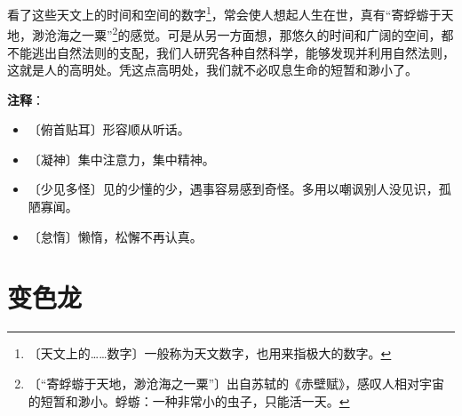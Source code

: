 \documentclass[12pt,UTF-8,openany]{ctexbook}
\begin{document}
\begin{normalsize}
    看了这些天文上的时间和空间的数字\footnote{〔天文上的……数字〕一般称为天文数字，也用来指极大的数字。}，常会使人想起人生在世，真有“寄蜉蝣于天地，渺沧海之一粟”\footnote{〔“寄蜉蝣于天地，渺沧海之一粟”〕出自苏轼的《赤壁赋》，感叹人相对宇宙的短暂和渺小。蜉蝣：一种非常小的虫子，只能活一天。}的感觉。可是从另一方面想，那悠久的时间和广阔的空间，都不能逃出自然法则的支配，我们人研究各种自然科学，能够发现并利用自然法则，这就是人的高明处。凭这点高明处，我们就不必叹息生命的短暂和渺小了。
    
\end{normalsize}


\newpage

\textbf{注释}：

\vspace{-1em}

\begin{itemize}
    \setlength\itemsep{-0.2em}
    \item 〔俯首贴耳〕形容顺从听话。
    \item 〔凝神〕集中注意力，集中精神。
    \item 〔少见多怪〕见的少懂的少，遇事容易感到奇怪。多用以嘲讽别人没见识，孤陋寡闻。
    \item 〔怠惰〕懒惰，松懈不再认真。
\end{itemize}

\chapter{变色龙}
\end{document}
